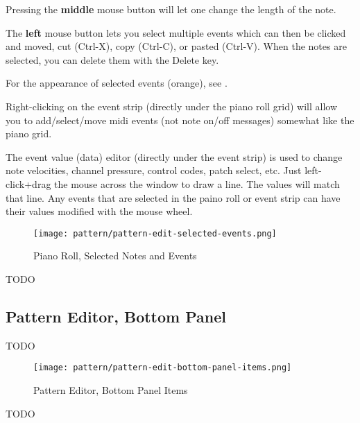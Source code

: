    Pressing the \textbf{middle} mouse button will let one change 
	the length of the note. 

	The \textbf{left} mouse button lets you select multiple events 
   which can then be clicked and moved,
   cut (Ctrl-X), 
   copy (Ctrl-C),
   or pasted (Ctrl-V).
   When the notes are selected,
   you can delete them with the Delete key.

   For the appearance of selected events (orange), see
   .

	Right-clicking on the event strip (directly under
	the piano roll grid) will allow you to add/select/move 
	midi events (not note on/off messages) somewhat like the 
	piano grid.

	The event value (data) editor (directly under the event strip) is used 
	to change note velocities, channel pressure, control codes,
	patch select, etc.
   Just left-click+drag the mouse across the window to draw a line.  The
   values will match that line.  Any events that are selected in the paino
   roll or event strip can have their values modified with the mouse wheel.

\begin{figure}[H]
   \centering 
   \texttt{[image: pattern/pattern-edit-selected-events.png]}
   \caption{Piano Roll, Selected Notes and Events}
   \label{fig:pattern_editor_selected_events}
\end{figure}

   TODO

\subsection{Pattern Editor, Bottom Panel}
\label{subsec:seq24_pattern_editor_bottom}

   TODO

\begin{figure}[H]
   \centering 
   \texttt{[image: pattern/pattern-edit-bottom-panel-items.png]}
   \caption{Pattern Editor, Bottom Panel Items}
   \label{fig:pattern_editor_bottom_panel_items}
\end{figure}

   TODO


